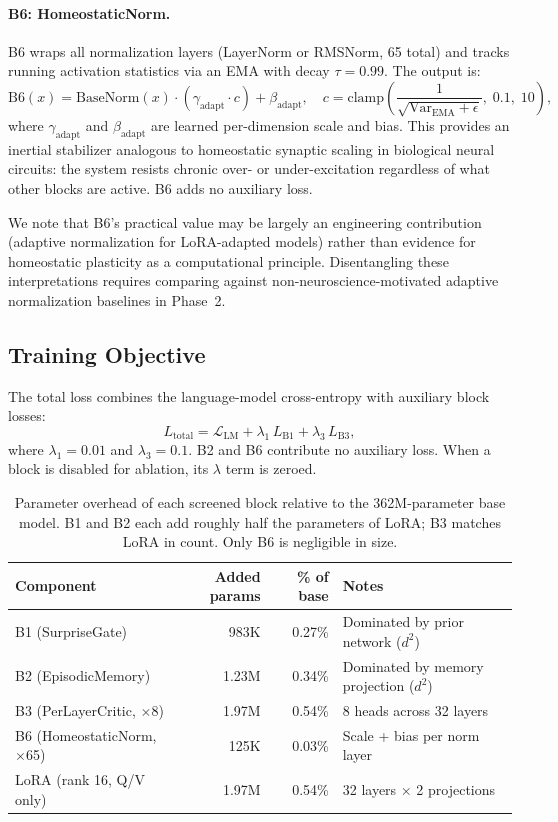 \documentclass[11pt]{article}
\begin{document}
\paragraph{B6: HomeostaticNorm.}
B6 wraps all normalization layers (LayerNorm or RMSNorm, 65 total) and tracks
running activation statistics via an EMA with decay $\tau = 0.99$.
The output is:
\[
\mathrm{B6}(x) = \mathrm{BaseNorm}(x) \cdot (\gamma_{\mathrm{adapt}} \cdot c)
  + \beta_{\mathrm{adapt}},
  \quad
  c = \mathrm{clamp}\!\left(\frac{1}{\sqrt{\mathrm{Var}_{\mathrm{EMA}}
  + \epsilon}},\; 0.1,\; 10\right),
\]
where $\gamma_{\mathrm{adapt}}$ and $\beta_{\mathrm{adapt}}$ are learned
per-dimension scale and bias.
This provides an inertial stabilizer analogous to homeostatic synaptic scaling
in biological neural circuits: the system resists chronic over- or
under-excitation regardless of what other blocks are active.
B6 adds no auxiliary loss.

We note that B6's practical value may be largely an engineering contribution
(adaptive normalization for LoRA-adapted models) rather than evidence for
homeostatic plasticity as a computational principle.
Disentangling these interpretations requires comparing against
non-neuroscience-motivated adaptive normalization baselines in Phase~2.

\subsection{Training Objective}

The total loss combines the language-model cross-entropy with auxiliary block
losses:
\[
L_{\mathrm{total}} = \mathcal{L}_{\mathrm{LM}}
  + \lambda_1\, L_{\mathrm{B1}}
  + \lambda_3\, L_{\mathrm{B3}},
\]
where $\lambda_1 = 0.01$ and $\lambda_3 = 0.1$.
B2 and B6 contribute no auxiliary loss.
When a block is disabled for ablation, its $\lambda$ term is zeroed.

\begin{table}[t]
\centering
\small
\begin{tabular}{lrrl}
\toprule
Component & Added params & \% of base & Notes \\
\midrule
B1 (SurpriseGate) & 983K & 0.27\% & Dominated by prior network ($d^2$) \\
B2 (EpisodicMemory) & 1.23M & 0.34\% & Dominated by memory projection ($d^2$) \\
B3 (PerLayerCritic, $\times$8) & 1.97M & 0.54\% & 8 heads across 32 layers \\
B6 (HomeostaticNorm, $\times$65) & 125K & 0.03\% & Scale + bias per norm layer \\
\midrule
LoRA (rank 16, Q/V only) & 1.97M & 0.54\% & 32 layers $\times$ 2 projections \\
\bottomrule
\end{tabular}
\caption{Parameter overhead of each screened block relative to the
362M-parameter base model.  B1 and B2 each add roughly half the parameters of
LoRA; B3 matches LoRA in count.  Only B6 is negligible in size.}
\label{tab:param-overhead}
\end{table}
\end{document}
